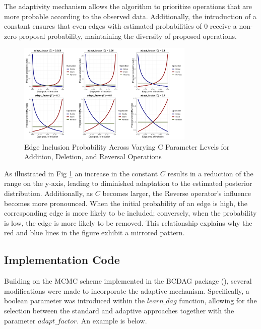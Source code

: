 \documentclass{report}
\begin{document}
The adaptivity mechanism allows the algorithm to prioritize operations that are more probable according to the observed data. Additionally, the introduction of a constant ensures that even edges with estimated probabilities of 0 receive a non-zero proposal probability, maintaining the diversity of proposed operations. 

\begin{figure}[h] 
	\centering
	\includegraphics[width=0.75\textwidth]{Figures/Adaptive_behaviour/c_comparison.png}
	\caption{Edge Inclusion Probability Across Varying C Parameter Levels for Addition, Deletion, and Reversal Operations}
	\label{fig:c-comp}
\end{figure}

As illustrated in Fig \ref{fig:c-comp} an increase in the constant $C$ results in a reduction of the range on the y-axis, leading to diminished adaptation to the estimated posterior distribution. Additionally, as $C$ becomes larger, the Reverse operator's influence becomes more pronounced. When the initial probability of an edge is high, the corresponding edge is more likely to be included; conversely, when the probability is low, the edge is more likely to be removed. This relationship explains why the red and blue lines in the figure exhibit a mirrored pattern.

\subsection{Implementation Code}

Building on the MCMC scheme implemented in the BCDAG package (\citet{castelletti2022bcdag}), several modifications were made to incorporate the adaptive mechanism. Specifically, a boolean parameter was introduced within the $\textit{learn\_dag}$ function, allowing for the selection between the standard and adaptive approaches together with the parameter $\textit{adapt\_factor}$. An example is below.
\end{document}
